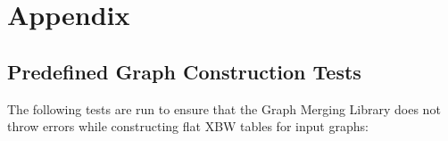\documentclass[a4paper,12pt,twoside,BCOR=10mm]{scrbook}
\begin{document}
\chapter{Appendix}
%

\section{Predefined Graph Construction Tests}
\label{sec:appendix_graph_const_tests}
%


The following tests are run to ensure that the Graph Merging Library does not throw errors
while constructing flat XBW tables for input graphs:
\end{document}

